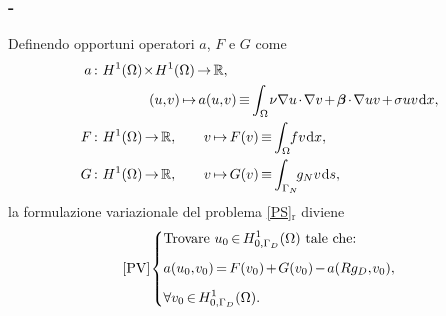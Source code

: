 \documentclass[11pt]{beamer}
\newcommand{\de}{\mathrm{d}}
\newcommand{\teqref}[2]{\hyperref[#1]{#2}}
\begin{document}
            \begin{frame}\frametitle{\insertpart{} - \insertsection{}}
                Definendo opportuni operatori $a$, $F$ e $G$ come
                \begin{equation*}
                    \setlength{\thinmuskip}{1mu}
                    \setlength{\medmuskip}{2mu}
                    \setlength{\thickmuskip}{3mu}
                    \begin{aligned}
                        a:\ &H^1(\Omega)\!\times\!H^1(\Omega)\rightarrow\mathbb R,\\
                        &\qquad\quad\;\;(u,v)\mapsto a(u,v)\equiv
                        \int_{\Omega}\nu\nabla u\cdot\nabla v
                        +\boldsymbol\beta\cdot\nabla uv
                        +\sigma uv \,\de x,\\
                        F:\ &H^1(\Omega)\rightarrow\mathbb R,\qquad
                        v\mapsto F(v)\equiv
                        \int_{\Omega}\!\!fv\, \de x,\\
                        G:\ &H^1(\Omega)\rightarrow\mathbb R,\qquad
                        v\mapsto G(v)\equiv
                        \int_{\Gamma_N}\!\!\!\!g_Nv\,\de s,
                    \end{aligned}
                \end{equation*}
                la formulazione variazionale del problema \teqref{eqPSRiformulato}{[PS]$_\text{r}$} diviene
                \begin{equation}
                    \setlength{\thinmuskip}{1mu}
                    \setlength{\medmuskip}{2mu}
                    \setlength{\thickmuskip}{3mu}
                    \text{[PV]}
                    \left\{
                    \begin{aligned}
                        &\text{Trovare } u_0 \in H^1_{0,\Gamma_D}(\Omega) \text{ tale che:}
                        \\[5pt]&a(u_0,v_0)=F(v_0)+G(v_0)-a(Rg_D,v_0),
                        \\[5pt]&\forall v_0\in H^1_{0,\Gamma_D}(\Omega).
                    \end{aligned}
                    \right.
                    \label{eqPSVariazionale}
                \end{equation}
            \end{frame}
\end{document}
